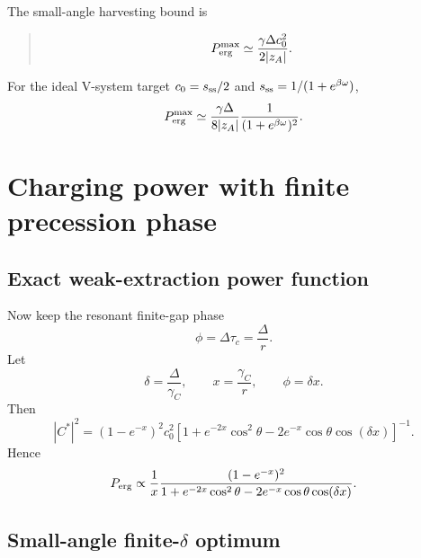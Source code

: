 \documentclass[11pt,a4paper]{article}
\newenvironment{resultbox}{\begin{quote}\small}{\end{quote}}
\begin{document}
The small-angle harvesting bound is
\begin{resultbox}
\begin{equation}
P_{\rm erg}^{\rm max}\simeq \frac{\gamma\Delta c_0^2}{2|z_A|}.
\end{equation}
\end{resultbox}
For the ideal V-system target $c_0=s_{\rm ss}/2$ and $s_{\rm ss}=1/(1+e^{\beta\omega})$,
\begin{equation}
P_{\rm erg}^{\rm max}\simeq \frac{\gamma\Delta}{8|z_A|}\frac{1}{(1+e^{\beta\omega})^2}.
\end{equation}

\section{Charging power with finite precession phase}

\subsection{Exact weak-extraction power function}

Now keep the resonant finite-gap phase
\begin{equation}
\phi=\Delta\tau_c=\frac{\Delta}{r}.
\end{equation}
Let
\begin{equation}
\delta=\frac{\Delta}{\gamma_C},
\qquad
x=\frac{\gamma_C}{r},
\qquad
\phi=\delta x.
\end{equation}
Then
\begin{equation}
|C^*|^2=(1-e^{-x})^2c_0^2
\left[1+e^{-2x}\cos^2\theta-2e^{-x}\cos\theta\cos(\delta x)\right]^{-1}.
\end{equation}
Hence
\begin{equation}
P_{\rm erg}\propto \frac1x
\frac{(1-e^{-x})^2}{1+e^{-2x}\cos^2\theta-2e^{-x}\cos\theta\cos(\delta x)}.
\end{equation}

\subsection{Small-angle finite-$\delta$ optimum}
\end{document}
